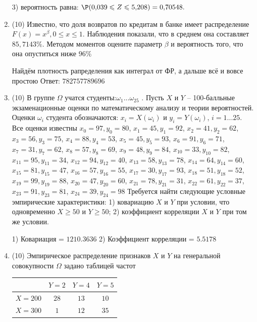 \documentclass[a4paper,14pt]{article}
\begin{document}
\begin{enumerate}
3) вероятность равна:
$
\P(0,\!039\leqslant Z\leqslant 5,\!208)=
0,\!70548.
$


\item


(10) Известно, что доля возвратов по кредитам в банке имеет распределение $F(x) = x ^{\beta}, 0 \leqslant x \leqslant 1$.
Наблюдения показали, что в среднем она составляет $85,7143\%$. Методом моментов оцените параметр $\beta$ и
вероятность того, что она опуститься ниже $96\%$




Найдём плотность рапределения как интеграл от ФР, а дальше всё и вовсе простою Ответ: $782757789696$


\item


(10) В группе $\Omega$ учатся студенты:$\omega _{1}...\omega _{25}$ . Пусть $X$ и $Y$ – 100-балльные экзаменационные оценки по
математическому анализу и теории вероятностей. Оценки $\omega _{i}$ студента обозначаются: $x _{i} = X(\omega _{i})$ и $y _{i} = Y(\omega _{i})$, $i = 1...25$. Все оценки известны
$x _{0} = 97, y _{0} = 80$, $x _{1} = 45, y _{1} = 92$, $x _{2} = 41, y _{2} = 62$, $x _{3} = 56, y _{3} = 75$, $x _{4} = 88, y _{4} = 53$, $x _{5} = 45, y _{5} = 93$, $x _{6} = 91, y _{6} = 71$, $x _{7} = 31, y _{7} = 62$, $x _{8} = 57, y _{8} = 69$, $x _{9} = 48, y _{9} = 84$, $x _{10} = 33, y _{10} = 82$, $x _{11} = 95, y _{11} = 34$, $x _{12} = 94, y _{12} = 40$, $x _{13} = 58, y _{13} = 78$, $x _{14} = 64, y _{14} = 60$, $x _{15} = 81, y _{15} = 47$, $x _{16} = 57, y _{16} = 55$, $x _{17} = 30, y _{17} = 93$, $x _{18} = 51, y _{18} = 52$, $x _{19} = 99, y _{19} = 88$, $x _{20} = 47, y _{20} = 60$, $x _{21} = 78, y _{21} = 31$, $x _{22} = 61, y _{22} = 37$, $x _{23} = 91, y _{23} = 81$, $x _{24} = 39, y _{24} = 98$
Требуется
найти следующие условные эмпирические характеристики: 1) ковариацию $X$ и $Y$ при условии, что одновременно $X \geqslant 50$
 и $Y \geqslant 50$; 2) коэффициент корреляции $X$ и $Y$ при том же условии.




1) Ковариация = $1210.3636$
2) Коэффициент корреляции = $5.5178$


\item


(10) Эмпирическое распределение признаков $X$ и $Y$ на генеральной совокупности $\Omega$ задано таблицей частот  
 
\begin{tabular}{ | c | c | c | c | }
\hline
 & $Y = 2$ & $Y = 4$ & $Y = 5$  \\ \hline
$X = 200$ & $28$ & $13$ & $10$\\ \hline
$X = 300$ & $1$ & $12$ & $35$\\
\hline
\end{tabular}


\end{enumerate}
\end{document}
